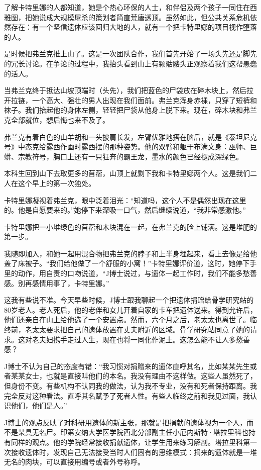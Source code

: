 \documentclass[12pt,oneside]{book}
\begin{document}
\begin{bookref}[frametitle={\cite{好好告别：世界葬礼观察手记}}]
了解卡特里娜的人都知道，她是个热心环保的人士，和伴侣及两个孩子一同住在西雅图，把她说成大规模屠杀的策划者简直荒唐透顶。虽然如此，但公共关系危机依然存在：有一个坚信遗体应该回归大地的人，就有一个把卡特里娜的项目视作堕落的人。

是时候把弗兰克推上山了。这是一次团队合作，我们首先开始了一场头先还是脚先的冗长讨论。在争论的过程中，我抬头看到山上有颗骷髅头正观察着我们这帮愚蠢的活人。

当弗兰克终于抵达山坡顶端时（头先），我们把蓝色的尸袋放在碎木块上，然后拉开拉链，一个高大、强壮的男人出现在我们面前。弗兰克浑身赤裸，只穿了短裤和袜子。我们抬起他的身体左侧，轻轻把尸袋从他身上脱下来。现在，碎木块和弗兰克全部就位，想后悔也来不及了。

弗兰克有着白色的山羊胡和一头披肩长发，左臂优雅地搭在脑后，就是《泰坦尼克号》中杰克给露西作画时露西摆的那种姿势。他的双臂和躯干布满文身：巫师、巨蟒、宗教符号，胸口上还有一只狂奔的霸王龙，墨水的颜色已经褪成深绿色。

本科生回到山下去取更多的苜蓿，山顶上就剩下我和卡特里娜两个人。这是我们二人在这个早上的第一次独处。

卡特里娜凝视着弗兰克，眼中泛着泪光：“知道吗，这个人不是偶然出现在这里的。他是自愿要来的。”她停下来深吸一口气，然后继续说道，“我非常感激他。”

卡特里娜把一小堆绿色的苜蓿和木块混在一起，在弗兰克的脸上铺满。这是堆肥的第一步。

我随即加入，和她一起用混合物把弗兰克的脖子和上半身埋起来，看上去像是给他盖了床被子。“我们给他做了一个舒服的小窝！”卡特里娜评价道，这时，她停下手里的动作，用自责的口吻说道，“J博士说过，与遗体一起工作时，我们不能多愁善感。别再感情用事了，卡特里娜。”

这我有些说不准。今天早些时候，J博士跟我聊起一个把遗体捐赠给骨学研究站的80岁老人。老人死后，他的老伴和女儿开着自家的卡车把遗体送来。得到允许后，他们还亲自在山上给他选了一个安置点。然而，六个月之后，老太太也离世了。临终前，老太太要求把自己的遗体放置在丈夫附近的区域。骨学研究站同意了她的请求。这对老夫妇携手走过人生，现在也将一同化作泥土。这怎么能不让人多愁善感？

J博士不认为自己的态度有错：“我习惯对捐赠来的遗体直呼其名，比如某某先生或者某某女士，也就是直接叫他们的本名。我没有理由不这样做。这些人虽然死了，但身份不变。有些机构不认同我的做法，认为我不专业，没有和死者保持距离。我完全反对这种看法。直呼其名赋予了死者人性。有些人临终之前和我见过面，我认识他们，他们是人。”

J博士的观点反映了对科研用遗体的新主张，那就是把捐献的遗体视为一个人，而不是某具无名尸。印第安纳大学医学院西北分部副主任小厄内斯特·塔拉里科也持有同样的观点。他的学院经常接收捐献遗体，让学生用来练习解剖。塔拉里科第一次接收遗体时，发现自己无法接受当时人们固有的思维模式：捐来的遗体就是一堆无名的肉块，可以直接用编号或者外号称呼。


\end{bookref}
\end{document}
